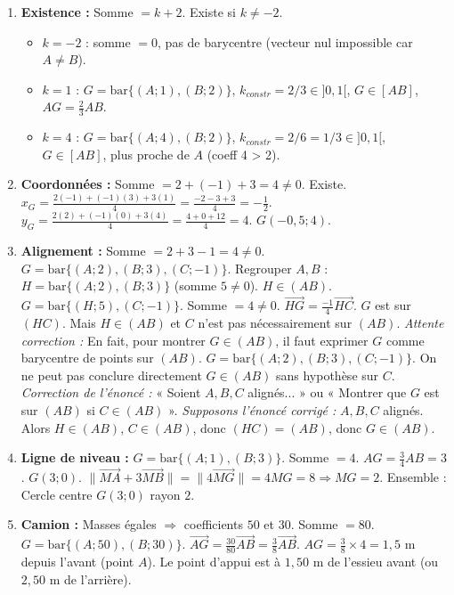 \documentclass[11pt]{article}
\begin{document}
\begin{corrige}
\begin{enumerate}
\item \textbf{Existence :} Somme $= k+2$. Existe si $k \neq -2$.
\begin{itemize}
\item $k=-2$ : somme $=0$, pas de barycentre (vecteur nul impossible car $A\neq B$).
\item $k=1$ : $G = \mathrm{bar}\{(A;1),(B;2)\}$, $k_{constr} = 2/3 \in ]0,1[$, $G \in [AB]$, $AG = \frac{2}{3}AB$.
\item $k=4$ : $G = \mathrm{bar}\{(A;4),(B;2)\}$, $k_{constr} = 2/6 = 1/3 \in ]0,1[$, $G \in [AB]$, plus proche de $A$ (coeff 4 > 2).
\end{itemize}
\item \textbf{Coordonnées :} Somme $= 2 + (-1) + 3 = 4 \neq 0$. Existe.
$x_G = \frac{2(-1) + (-1)(3) + 3(1)}{4} = \frac{-2 -3 + 3}{4} = -\frac{1}{2}$.
$y_G = \frac{2(2) + (-1)(0) + 3(4)}{4} = \frac{4 + 0 + 12}{4} = 4$.
$G(-0,5 ; 4)$.
\item \textbf{Alignement :} Somme $= 2+3-1=4\neq 0$. $G = \mathrm{bar}\{(A;2), (B;3), (C;-1)\}$.
Regrouper $A,B$ : $H = \mathrm{bar}\{(A;2),(B;3)\}$ (somme $5\neq 0$). $H \in (AB)$.
$G = \mathrm{bar}\{(H;5), (C;-1)\}$. Somme $= 4 \neq 0$.
$\overrightarrow{HG} = \frac{-1}{4}\overrightarrow{HC}$. $G$ est sur $(HC)$. Mais $H \in (AB)$ et $C$ n'est pas nécessairement sur $(AB)$.
\emph{Attente correction :} En fait, pour montrer $G \in (AB)$, il faut exprimer $G$ comme barycentre de points sur $(AB)$.
$G = \mathrm{bar}\{(A;2), (B;3), (C;-1)\}$.
On ne peut pas conclure directement $G \in (AB)$ sans hypothèse sur $C$.
\emph{Correction de l'énoncé :} « Soient $A,B,C$ alignés... » ou « Montrer que $G$ est sur $(AB)$ si $C \in (AB)$ ».
\emph{Supposons l'énoncé corrigé :} $A,B,C$ alignés. Alors $H \in (AB)$, $C \in (AB)$, donc $(HC) = (AB)$, donc $G \in (AB)$.
\item \textbf{Ligne de niveau :} $G = \mathrm{bar}\{(A;1),(B;3)\}$. Somme $=4$. $AG = \frac{3}{4}AB = 3$. $G(3;0)$.
$\|\overrightarrow{MA} + 3\overrightarrow{MB}\| = \|4\overrightarrow{MG}\| = 4 MG = 8 \Rightarrow MG = 2$.
Ensemble : Cercle centre $G(3;0)$ rayon $2$.
\item \textbf{Camion :} Masses égales $\Rightarrow$ coefficients $50$ et $30$. Somme $=80$.
$G = \mathrm{bar}\{(A;50), (B;30)\}$.
$\overrightarrow{AG} = \frac{30}{80}\overrightarrow{AB} = \frac{3}{8}\overrightarrow{AB}$.
$AG = \frac{3}{8} \times 4 = 1,5$ m depuis l'avant (point $A$).
Le point d'appui est à $1,50$ m de l'essieu avant (ou $2,50$ m de l'arrière).
\end{enumerate}
\end{corrige}
\end{document}
